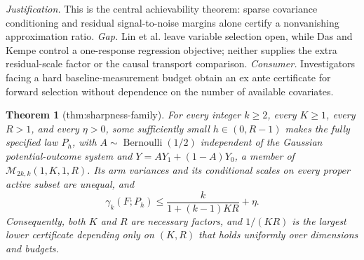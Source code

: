 \documentclass{article}
\newtheorem{theorem}{Theorem}
\begin{document}
\par\smallskip\noindent \textit{Justification.} This is the central achievability theorem: sparse covariance conditioning and residual signal-to-noise margins alone certify a nonvanishing approximation ratio. \textit{Gap.} Lin et al. leave variable selection open, while Das and Kempe control a one-response regression objective; neither supplies the extra residual-scale factor or the causal transport comparison. \textit{Consumer.} Investigators facing a hard baseline-measurement budget obtain an ex ante certificate for forward selection without dependence on the number of available covariates.

\begin{theorem}[thm:sharpness-family]\label{thm:sharpness-family}
For every integer \(k\ge2\), every \(K\ge1\), every \(R>1\), and every \(\eta>0\), some sufficiently small \(h\in(0,R-1)\) makes the fully specified law \(P_h\), with \(A\sim\operatorname{Bernoulli}(1/2)\) independent of the Gaussian potential-outcome system and \(Y=AY_1+(1-A)Y_0\), a member of \(\mathcal M_{2k,k}(1,K,1,R)\). Its arm variances and its conditional scales on every proper active subset are unequal, and \[\gamma_k(F;P_h)\le\frac{k}{1+(k-1)KR}+\eta.\] Consequently, both \(K\) and \(R\) are necessary factors, and \(1/(KR)\) is the largest lower certificate depending only on \((K,R)\) that holds uniformly over dimensions and budgets.
\end{theorem}
\end{document}
